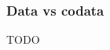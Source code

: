 \subsubsection{Data vs codata} \label{subsubsec:data-codata}



%
%

TODO~\cite{downen2019codata} %



